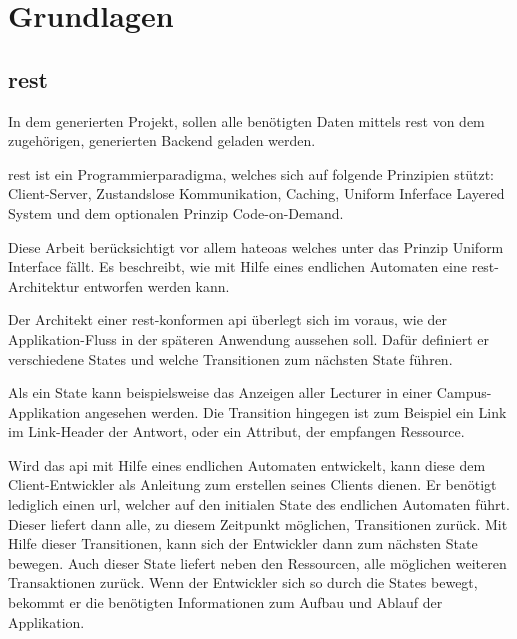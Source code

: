\chapter{Grundlagen}\label{ch:basics}
\section{\acf{rest}}\label{sec:rest}
In dem generierten Projekt, sollen alle benötigten Daten mittels \ac{rest} von dem zugehörigen, generierten Backend geladen werden. 

\ac{rest} \cite{rest_fielding} ist ein Programmierparadigma, welches sich auf folgende Prinzipien stützt: Client-Server, Zustandslose Kommunikation, Caching, Uniform Inferface Layered System und dem optionalen Prinzip Code-on-Demand.

Diese Arbeit berücksichtigt vor allem \acf{hateoas} welches unter das Prinzip Uniform Interface fällt. Es beschreibt, wie mit Hilfe eines endlichen Automaten eine \ac{rest}-Architektur entworfen werden kann.

Der Architekt einer \ac{rest}-konformen \acf{api} überlegt sich im voraus, wie der Applikation-Fluss in der späteren Anwendung aussehen soll. Dafür definiert er verschiedene States und welche Transitionen zum nächsten State führen.

Als ein State kann beispielsweise das Anzeigen aller Lecturer in einer Campus-Applikation angesehen werden.
Die Transition hingegen ist zum Beispiel ein Link im Link-Header der Antwort, oder ein Attribut, der empfangen Ressource. 

Wird das \ac{api} mit Hilfe eines endlichen Automaten entwickelt, kann diese dem Client-Entwickler als Anleitung zum erstellen seines Clients dienen. Er benötigt lediglich einen \acf{url}, welcher auf den initialen State des endlichen Automaten führt. Dieser liefert dann alle, zu diesem Zeitpunkt möglichen, Transitionen zurück. Mit Hilfe dieser Transitionen, kann sich der Entwickler dann zum nächsten State bewegen. Auch dieser State liefert neben den Ressourcen, alle möglichen weiteren Transaktionen zurück. 
Wenn der Entwickler sich so durch die States bewegt, bekommt er die benötigten Informationen zum Aufbau und Ablauf der Applikation.

